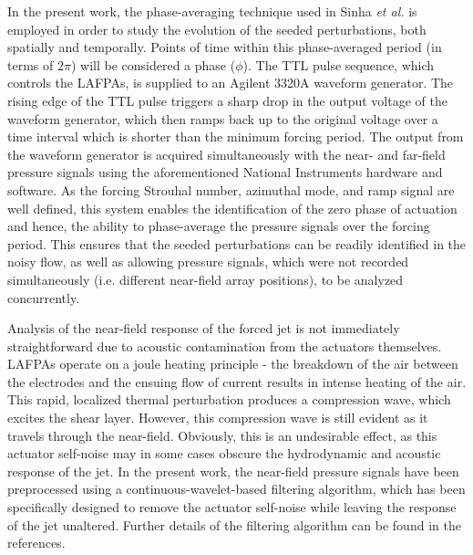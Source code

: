 \documentclass[english]{aiaa-tc}
\begin{document}
In the present work, the phase-averaging technique used in Sinha {\em et al.}\cite{sinha2013} is employed in order to study the evolution of the seeded perturbations, both spatially and temporally. Points of time within this phase-averaged period (in terms of $2\pi$) will be considered a phase ($\phi$). The TTL pulse sequence, which controls the LAFPAs, is supplied to an Agilent 3320A waveform generator. The rising edge of the TTL pulse triggers a sharp drop in the output voltage of the waveform generator, which then ramps back up to the original voltage over a time interval which is shorter than the minimum forcing period. The output from the waveform generator is acquired simultaneously with the near- and far-field pressure signals using the aforementioned National Instruments hardware and software. As the forcing Strouhal number, azimuthal mode, and ramp signal are well defined, this system enables the identification of the zero phase of actuation and hence, the ability to phase-average the pressure signals over the forcing period. This ensures that the seeded perturbations can be readily identified in the noisy flow, as well as allowing pressure signals, which were not recorded simultaneously (i.e. different near-field array positions), to be analyzed concurrently. 

Analysis of the near-field response of the forced jet is not immediately straightforward due to acoustic contamination from the actuators themselves\cite{sinha2013}. LAFPAs operate on a joule heating principle - the breakdown of the air between the electrodes and the ensuing flow of current results in intense heating of the air. This rapid, localized thermal perturbation produces a compression wave, which excites the shear layer. However, this compression wave is still evident as it travels through the near-field. Obviously, this is an undesirable effect, as this actuator self-noise may in some cases obscure the hydrodynamic and acoustic response of the jet. In the present work, the near-field pressure signals have been preprocessed using a continuous-wavelet-based filtering algorithm, which has been specifically designed to remove the actuator self-noise while leaving the response of the jet unaltered. Further details of the filtering algorithm can be found in the references\cite{Alkandry2013}.
\end{document}
